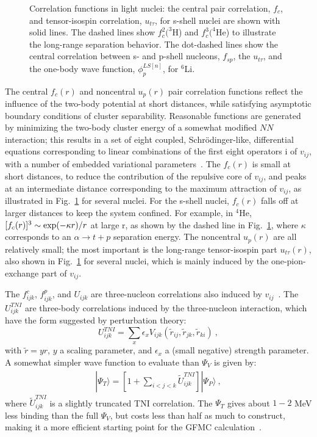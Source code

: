\begin{figure}
\centerline{}
\caption{Correlation functions in light nuclei: the central pair correlation,
$f_c$, and tensor-isospin correlation, $u_{t\tau}$, for s-shell nuclei are 
shown with solid lines.  The dashed lines show $f_c^2(^3$H) and $f_c^3(^4$He) 
to illustrate the long-range separation behavior. The dot-dashed lines show 
the central correlation between s- and p-shell nucleons, $f_{sp}$, the
$u_{t\tau}$, and the one-body wave function, $\phi^{LS[n]}_p$, for $^6$Li.}
\label{fig:corr}
\end{figure}

The central $f_c(r)$ and noncentral $u_p(r)$ pair correlation
functions reflect the influence of the two-body potential at short distances,
while satisfying asymptotic boundary conditions of cluster separability.
Reasonable functions are generated by minimizing the two-body cluster
energy of a somewhat modified $N\!N$ interaction;
this results in a set of eight coupled, Schr\"{o}dinger-like, differential
equations corresponding to linear combinations of the first eight operators i
of $v_{ij}$, with a number of embedded variational parameters~\cite{W91}.
The $f_c(r)$ is small at short distances, to reduce the contribution
of the repulsive core of $v_{ij}$, and peaks at an intermediate distance
corresponding to the maximum attraction of $v_{ij}$, as illustrated in
Fig.~\ref{fig:corr} for several nuclei.
For the s-shell nuclei, $f_c(r)$ falls off at larger distances to keep the
system confined.
For example, in $^4$He, $[f_c(r)]^3 \sim {\rm {exp}}(-\kappa r)/r$ at large r,
as shown by the dashed line in Fig.~\ref{fig:corr},
where $\kappa$ corresponds to an $\alpha \rightarrow t+p$ separation energy.
The noncentral $u_p(r)$ are all relatively small; the most important
is the long-range tensor-isospin part $u_{t\tau}(r)$, also shown in
Fig.~\ref{fig:corr} for several nuclei, which is mainly
induced by the one-pion-exchange part of $v_{ij}$.

The $f^c_{ijk}$, $f^p_{ijk}$, and $U_{ijk}$ are three-nucleon correlations
also induced by $v_{ij}$~\cite{APW95}.
The $U^{TNI}_{ijk}$ are three-body correlations induced by the three-nucleon
interaction, which have the form suggested by perturbation theory:
\begin{equation}
     U^{TNI}_{ijk} = \sum_x \epsilon_x V_{ijk}(\tilde{ r}_{ij},
                     \tilde{r}_{jk}, \tilde{ r}_{ki}) \ ,
\label{eq:bestuijk}
\end{equation}
with $\tilde{r}=yr$, $y$ a scaling parameter, and $\epsilon_x$ a (small
negative) strength parameter.
A somewhat simpler wave function to evaluate than $\Psi_V$ is given by:
\begin{eqnarray}
|\Psi_{T}\rangle = \left[1 + \sum_{i<j<k}\tilde{U}^{TNI}_{ijk}\right]
|\Psi_P\rangle \ ,
\label{eq:psitgfmc}
\end{eqnarray}
where $\tilde{U}^{TNI}_{ijk}$ is a slightly truncated TNI correlation.
The $\Psi_T$ gives about $1-2$ MeV less binding than the full $\Psi_V$,
but costs less than half as much to construct, making it a more
efficient starting point for the GFMC calculation~\cite{PPCPW97}.

